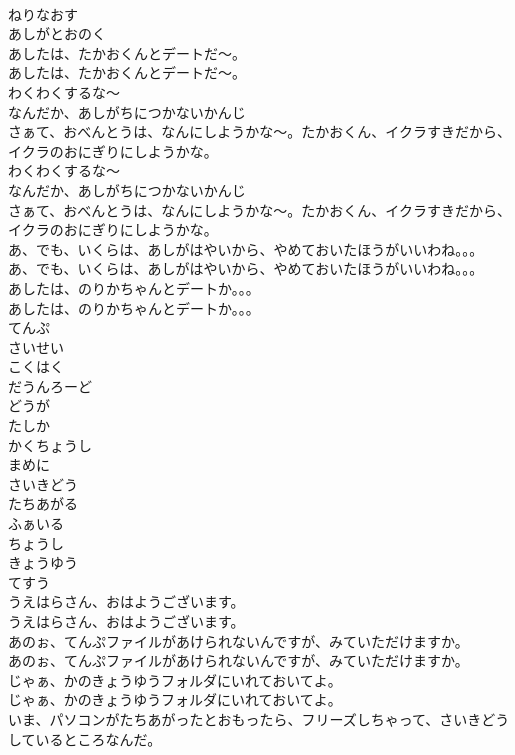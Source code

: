 \documentclass[8pt]{extreport}
\begin{document}
\begin{CJK}{UTF8}{min}
\\	ねりなおす
\\	あしがとおのく
\\	あしたは、たかおくんとデートだ～。
\\	あしたは、たかおくんとデートだ～。
\\	わくわくするな～
\\	なんだか、あしがちにつかないかんじ
\\	さぁて、おべんとうは、なんにしようかな～。たかおくん、イクラすきだから、イクラのおにぎりにしようかな。
\\	わくわくするな～
\\	なんだか、あしがちにつかないかんじ
\\	さぁて、おべんとうは、なんにしようかな～。たかおくん、イクラすきだから、イクラのおにぎりにしようかな。
\\	あ、でも、いくらは、あしがはやいから、やめておいたほうがいいわね。。。
\\	あ、でも、いくらは、あしがはやいから、やめておいたほうがいいわね。。。
\\	あしたは、のりかちゃんとデートか。。。
\\	あしたは、のりかちゃんとデートか。。。
\\	てんぷ
\\	さいせい
\\	こくはく
\\	だうんろーど
\\	どうが
\\	たしか
\\	かくちょうし
\\	まめに
\\	さいきどう
\\	たちあがる
\\	ふぁいる
\\	ちょうし
\\	きょうゆう
\\	てすう
\\	うえはらさん、おはようございます。
\\	うえはらさん、おはようございます。
\\	あのぉ、てんぷファイルがあけられないんですが、みていただけますか。
\\	あのぉ、てんぷファイルがあけられないんですが、みていただけますか。
\\	じゃぁ、かのきょうゆうフォルダにいれておいてよ。
\\	じゃぁ、かのきょうゆうフォルダにいれておいてよ。
\\	いま、パソコンがたちあがったとおもったら、フリーズしちゃって、さいきどうしているところなんだ。

\end{CJK}
\end{document}
